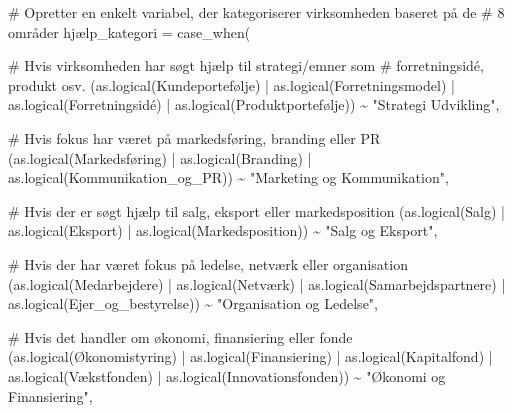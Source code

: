 \documentclass[
  11pt,
  letterpaper,
  DIV=11,
  numbers=noendperiod]{scrartcl}
\newenvironment{Shaded}{\begin{snugshade}}{\end{snugshade}}
\newcommand{\AttributeTok}[1]{\textcolor[rgb]{0.40,0.45,0.13}{#1}}
\newcommand{\CommentTok}[1]{\textcolor[rgb]{0.37,0.37,0.37}{#1}}
\newcommand{\FunctionTok}[1]{\textcolor[rgb]{0.28,0.35,0.67}{#1}}
\newcommand{\NormalTok}[1]{\textcolor[rgb]{0.00,0.23,0.31}{#1}}
\newcommand{\SpecialCharTok}[1]{\textcolor[rgb]{0.37,0.37,0.37}{#1}}
\newcommand{\StringTok}[1]{\textcolor[rgb]{0.13,0.47,0.30}{#1}}
\begin{document}
\begin{Shaded}
\begin{Highlighting}[]
\CommentTok{\# Opretter en enkelt variabel, der kategoriserer virksomheden baseret på de }
    \CommentTok{\# 8 områder}
\NormalTok{    hjælp}\AttributeTok{\_kategori =} \FunctionTok{case\_when}\NormalTok{(}

\CommentTok{\# Hvis virksomheden har søgt hjælp til strategi/emner som }
      \CommentTok{\# forretningsidé, produkt osv.}
\NormalTok{      (}\FunctionTok{as.logical}\NormalTok{(Kundeportefølje) }\SpecialCharTok{|} \FunctionTok{as.logical}\NormalTok{(Forretningsmodel) }\SpecialCharTok{|} 
         \FunctionTok{as.logical}\NormalTok{(Forretningsidé) }\SpecialCharTok{|} \FunctionTok{as.logical}\NormalTok{(Produktportefølje)) }
      \SpecialCharTok{\textasciitilde{}} \StringTok{"Strategi Udvikling"}\NormalTok{,}
      
\CommentTok{\# Hvis fokus har været på markedsføring, branding eller PR}
\NormalTok{      (}\FunctionTok{as.logical}\NormalTok{(Markedsføring) }\SpecialCharTok{|} \FunctionTok{as.logical}\NormalTok{(Branding) }\SpecialCharTok{|} 
         \FunctionTok{as.logical}\NormalTok{(Kommunikation\_og\_PR)) }\SpecialCharTok{\textasciitilde{}} \StringTok{"Marketing og Kommunikation"}\NormalTok{,}

\CommentTok{\# Hvis der er søgt hjælp til salg, eksport eller markedsposition}
\NormalTok{      (}\FunctionTok{as.logical}\NormalTok{(Salg) }\SpecialCharTok{|} \FunctionTok{as.logical}\NormalTok{(Eksport) }\SpecialCharTok{|} 
         \FunctionTok{as.logical}\NormalTok{(Markedsposition)) }\SpecialCharTok{\textasciitilde{}} \StringTok{"Salg og Eksport"}\NormalTok{,}
      
\CommentTok{\# Hvis der har været fokus på ledelse, netværk eller organisation}
\NormalTok{      (}\FunctionTok{as.logical}\NormalTok{(Medarbejdere) }\SpecialCharTok{|} \FunctionTok{as.logical}\NormalTok{(Netværk) }\SpecialCharTok{|} 
         \FunctionTok{as.logical}\NormalTok{(Samarbejdspartnere) }\SpecialCharTok{|} \FunctionTok{as.logical}\NormalTok{(Ejer\_og\_bestyrelse)) }
                                            \SpecialCharTok{\textasciitilde{}} \StringTok{"Organisation og Ledelse"}\NormalTok{,}
      
\CommentTok{\# Hvis det handler om økonomi, finansiering eller fonde}
\NormalTok{      (}\FunctionTok{as.logical}\NormalTok{(Økonomistyring) }\SpecialCharTok{|} \FunctionTok{as.logical}\NormalTok{(Finansiering) }\SpecialCharTok{|} 
         \FunctionTok{as.logical}\NormalTok{(Kapitalfond) }\SpecialCharTok{|} \FunctionTok{as.logical}\NormalTok{(Vækstfonden) }\SpecialCharTok{|} 
         \FunctionTok{as.logical}\NormalTok{(Innovationsfonden)) }\SpecialCharTok{\textasciitilde{}} \StringTok{"Økonomi og Finansiering"}\NormalTok{,}
      

\end{Highlighting}
\end{Shaded}
\end{document}
